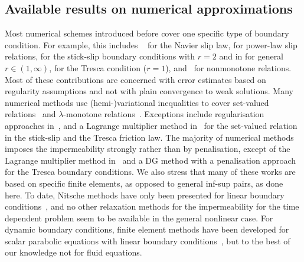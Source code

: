 \documentclass[reqno,a4paper]{amsart}
\begin{document}
	\subsection{Available results on numerical approximations} 
	Most numerical schemes introduced before cover one specific type of boundary condition. For example,  this includes ~\cite{V.1987,V.1991} for the Navier slip law, \cite{DjokoKokoMbehouEtAl2022} for power-law slip relations, \cite{DM.2013,D.2014,DK.2016} for the stick-slip boundary conditions with $r = 2$ and in \cite{HKSS.2018} for general $r\in (1,\infty)$, \cite{LL.2010,LA.2011,ABGS.2014,JHYW.2018,AABS.2019,DjokoKokoKucera2019,ZJK.2023} for the Tresca condition ($r=1$), and~\cite{Fang2020,HCJ.2021} for nonmonotone relations. 
	Most of these contributions are concerned with error estimates based on regularity assumptions and not with plain convergence to weak solutions. 
	Many numerical methods use (hemi-)variational inequalities to cover set-valued relations~\cite{DM.2013,D.2014,DK.2016} and $\lambda$-monotone relations~\cite{Fang2020,HCJ.2021}. 
	Exceptions include regularisation approaches in~\cite{D.2014,LA.2011,DjokoKokoKucera2019}, and a Lagrange multiplier method in~\cite{ZJK.2023} for the set-valued relation in the stick-slip and the Tresca friction law. 
	The majority of numerical methods imposes the impermeability strongly rather than by penalisation, except of the Lagrange multiplier method in~\cite{AABS.2019} and a DG method with a penalisation approach~\cite{JHYW.2018} for the Tresca boundary conditions.
	We also stress that many of these works are based on specific finite elements, as opposed to general inf-sup pairs, as done here. 
	To date, Nitsche methods have only been presented for linear boundary conditions~\cite{BansalBarnafiPandey2024}, and  no other relaxation methods for the impermeability for the time dependent problem seem to be available in  the general nonlinear case. 
	For dynamic boundary conditions, finite element methods have been developed for scalar parabolic equations with linear boundary conditions~\cite{Fairweather1979,Kovacs2017,AltmannZimmer2024}, but to the best of our knowledge not for fluid equations.  
	
\end{document}
